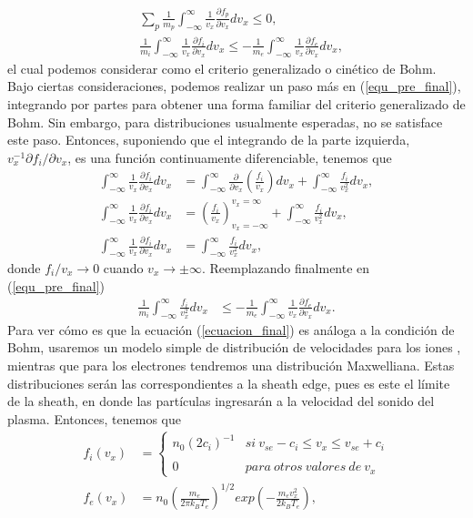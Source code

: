 \documentclass[../main.tex]{subfiles}
\begin{document}
{\begin{align}
        &\sum_p \frac{1}{m_p} \int _{-\infty}^{\infty}\frac{1}{v_x}\frac{\partial f_p}{\partial v_x}dv_x \leq 0, \\
        &\frac{1}{m_i} \int_{-\infty}^{\infty} \frac{1}{v_x}\frac{\partial f_i}{\partial v_x}dv_x \leq  -\frac{1}{m_e} \int_{-\infty}^{\infty} \frac{1}{v_x}\frac{\partial f_e}{\partial v_x} dv_x, \label{equ_pre_final}
    \end{align}
    el cual podemos considerar como el criterio generalizado o cinético de Bohm. Bajo ciertas consideraciones, podemos realizar un paso más en (\ref{equ_pre_final}), integrando por partes para obtener una forma familiar del criterio generalizado de Bohm. Sin embargo, para distribuciones usualmente esperadas, no se satisface este paso. Entonces, suponiendo que el integrando de la parte izquierda, $v_x^{-1}\partial f_i / \partial v_x$, es una función continuamente diferenciable, tenemos que
    \begin{align}
        \int _{-\infty}^{\infty} \frac{1}{v_x}\frac{\partial f_i}{\partial v_x}dv_x &= \int_{-\infty}^{\infty}\frac{\partial }{\partial v_x} \left( \frac{f_i}{v_x} \right)dv_x + \int_{-\infty}^{\infty}\frac{f_i}{v_x^2}dv_x, \\
        \int _{-\infty}^{\infty} \frac{1}{v_x}\frac{\partial f_i}{\partial v_x}dv_x &= \left(\frac{f_i}{v_x}\right)^{v_x = \infty}_{v_x = -\infty} + \int_{-\infty}^{\infty}\frac{f_i}{v_x^2}dv_x, \\
        \int _{-\infty}^{\infty} \frac{1}{v_x}\frac{\partial f_i}{\partial v_x}dv_x &= \int_{-\infty}^{\infty}\frac{f_i}{v_x^2}dv_x,
    \end{align}
    donde $f_i/v_x \rightarrow 0$ cuando $v_x \rightarrow \pm \infty$. Reemplazando finalmente en (\ref{equ_pre_final})
    \begin{align}
        \frac{1}{m_i} \int_{-\infty}^{\infty} \frac{f_i}{v_x^2}dv_x &\leq  -\frac{1}{m_e} \int_{-\infty}^{\infty} \frac{1}{v_x}\frac{\partial f_e}{\partial v_x} dv_x. \label{ecuacion_final}
    \end{align}    
    Para ver cómo es que la ecuación (\ref{ecuacion_final}) es análoga a la condición de Bohm, usaremos un modelo simple de distribución de velocidades para los iones \cite{stangeby2000plasma}, mientras que para los electrones tendremos una distribución Maxwelliana. Estas distribuciones serán las correspondientes a la sheath edge, pues es este el límite de la sheath, en donde las partículas ingresarán a la velocidad del sonido del plasma. Entonces, tenemos que
    \begin{align}
        f_i\left(v_x\right) &= \left\{ \begin{array}{lcc}
             n_0\left(2c_i\right)^{-1} & si \ v_{se}-c_i \leq v_x \leq v_{se}+c_i \\
             \\ 0 &  para \ otros \ valores \ de \ v_x
             \end{array}
   \right. \label{modelo_distribucion_iones} \\
        f_e\left(v_x\right) &= n_0\left(\frac{m_e}{2\pi k_BT_e}\right)^{1/2}exp\left(-\frac{m_ev_x^2}{2k_BT_e}\right),
        \end{align}
   
}
\end{document}
